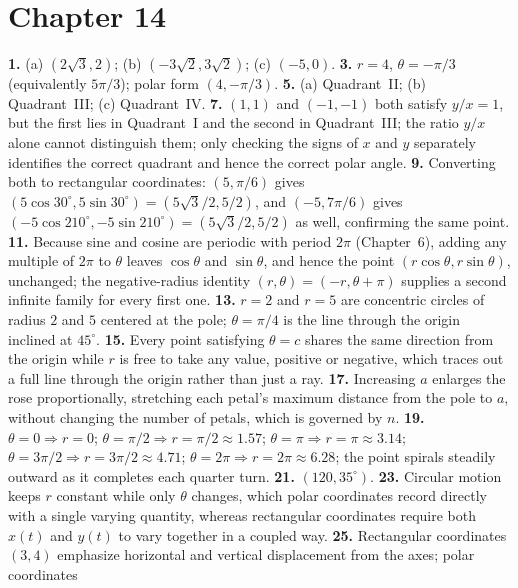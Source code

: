 \section*{Chapter 14}
\textbf{1.} (a) $(2\sqrt3, 2)$; (b) $(-3\sqrt2, 3\sqrt2)$; (c) $(-5,0)$.
\quad
\textbf{3.} $r=4$, $\theta = -\pi/3$ (equivalently $5\pi/3$); polar form
$(4, -\pi/3)$. \quad
\textbf{5.} (a) Quadrant~II; (b) Quadrant~III; (c) Quadrant~IV. \quad
\textbf{7.} $(1,1)$ and $(-1,-1)$ both satisfy $y/x=1$, but the first
lies in Quadrant~I and the second in Quadrant~III; the ratio $y/x$ alone
cannot distinguish them; only checking the signs of $x$ and $y$
separately identifies the correct quadrant and hence the correct polar
angle. \quad
\textbf{9.} Converting both to rectangular coordinates: $(5,\pi/6)$
gives $(5\cos30^\circ, 5\sin30^\circ) = (5\sqrt3/2, 5/2)$, and
$(-5,7\pi/6)$ gives $(-5\cos210^\circ,-5\sin210^\circ) =
(5\sqrt3/2,5/2)$ as well, confirming the same point. \quad
\textbf{11.} Because sine and cosine are periodic with period $2\pi$
(Chapter~6), adding any multiple of $2\pi$ to $\theta$ leaves
$\cos\theta$ and $\sin\theta$, and hence the point $(r\cos\theta,
r\sin\theta)$, unchanged; the negative-radius identity
$(r,\theta)=(-r,\theta+\pi)$ supplies a second infinite family for every
first one. \quad
\textbf{13.} $r=2$ and $r=5$ are concentric circles of radius $2$ and
$5$ centered at the pole; $\theta=\pi/4$ is the line through the origin
inclined at $45^\circ$. \quad
\textbf{15.} Every point satisfying $\theta=c$ shares the same direction
from the origin while $r$ is free to take any value, positive or
negative, which traces out a full line through the origin rather than
just a ray. \quad
\textbf{17.} Increasing $a$ enlarges the rose proportionally, stretching
each petal's maximum distance from the pole to $a$, without changing the
number of petals, which is governed by $n$. \quad
\textbf{19.} $\theta=0 \Rightarrow r=0$; $\theta=\pi/2 \Rightarrow
r=\pi/2\approx1.57$; $\theta=\pi \Rightarrow r=\pi\approx3.14$;
$\theta=3\pi/2 \Rightarrow r=3\pi/2\approx4.71$; $\theta=2\pi \Rightarrow
r=2\pi\approx6.28$; the point spirals steadily outward as it completes
each quarter turn. \quad
\textbf{21.} $(120, 35^\circ)$. \quad
\textbf{23.} Circular motion keeps $r$ constant while only $\theta$
changes, which polar coordinates record directly with a single varying
quantity, whereas rectangular coordinates require both $x(t)$ and $y(t)$
to vary together in a coupled way. \quad
\textbf{25.} Rectangular coordinates $(3,4)$ emphasize horizontal and
vertical displacement from the axes; polar coordinates
